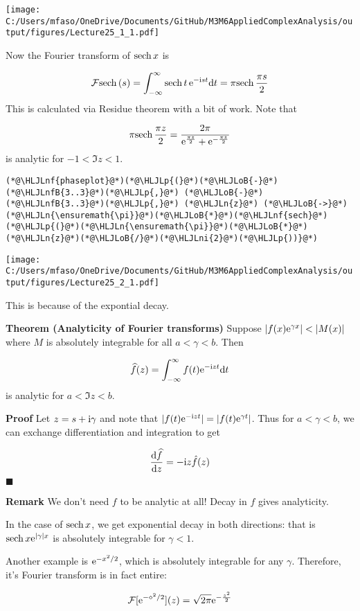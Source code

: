 \documentclass[12pt,landscape]{article}
\newcommand{\HLJLn}[1]{#1}
\newcommand{\HLJLnf}[1]{\textcolor[RGB]{66,102,213}{#1}}
\newcommand{\HLJLnfB}[1]{\textcolor[RGB]{59,151,46}{#1}}
\newcommand{\HLJLni}[1]{\textcolor[RGB]{59,151,46}{#1}}
\newcommand{\HLJLoB}[1]{\textcolor[RGB]{102,102,102}{\textbf{#1}}}
\newcommand{\HLJLp}[1]{#1}
\def\D{ {\rm d} }
\def\I{ {\rm i} }
\def\E{ {\rm e} }
\def\FF{ {\cal F} }
\def\sech{ {\rm sech}\, }
\def\dt{\D t}
\def\dz{\D z}
\begin{document}
{\texttt{[image: C:/Users/mfaso/OneDrive/Documents/GitHub/M3M6AppliedComplexAnalysis/output/figures/Lecture25\_1\_1.pdf]}

Now the Fourier transform of $\sech x$ is

\[
\FF\sech(s) = \int_{-\infty}^\infty \sech t \, \E^{-\I s t} \dt = \pi \sech{\pi s \over 2}
\]
This is calculated via Residue theorem with a bit of work. Note that

\[
\pi \sech {\pi z \over 2} = {2 \pi \over \E^{\pi z \over 2} + \E^{-{\pi z \over 2}}}
\]
is analytic for $-1 < \Im z < 1$.


\begin{lstlisting}
(*@\HLJLnf{phaseplot}@*)(*@\HLJLp{(}@*)(*@\HLJLoB{-}@*)(*@\HLJLnfB{3..3}@*)(*@\HLJLp{,}@*) (*@\HLJLoB{-}@*)(*@\HLJLnfB{3..3}@*)(*@\HLJLp{,}@*) (*@\HLJLn{z}@*) (*@\HLJLoB{->}@*) (*@\HLJLn{\ensuremath{\pi}}@*)(*@\HLJLoB{*}@*)(*@\HLJLnf{sech}@*)(*@\HLJLp{(}@*)(*@\HLJLn{\ensuremath{\pi}}@*)(*@\HLJLoB{*}@*)(*@\HLJLn{z}@*)(*@\HLJLoB{/}@*)(*@\HLJLni{2}@*)(*@\HLJLp{))}@*)
\end{lstlisting}

\texttt{[image: C:/Users/mfaso/OneDrive/Documents/GitHub/M3M6AppliedComplexAnalysis/output/figures/Lecture25\_2\_1.pdf]}

This is because of the expontial decay.

\textbf{Theorem (Analyticity of Fourier transforms)} Suppose $|f(x) \E^{\gamma x}| < |M(x)|$ where $M$ is absolutely integrable for all $a < \gamma < b$. Then

\[
\widehat f(z) = \int_{-\infty}^\infty f(t) \E^{-\I z t} \dt
\]
is analytic for $a < \Im z < b$.

\textbf{Proof} Let $z = s + \I \gamma$ and note that $|f(t) \E^{-\I z t}| = |f(t) \E^{\gamma t}|$. Thus for $a < \gamma < b$, we can exchange differentiation and integration to get

\[
{\D \widehat f \over \dz} = -\I z \hat f(z)
\]
\ensuremath{\blacksquare}

\textbf{Remark} We don't need $f$ to be analytic at all!  Decay in $f$ gives analyticity.

In the case of $\sech x$, we get exponential decay in both directions: that is $\sech x \E^{|\gamma| x}$ is absolutely integrable for $\gamma < 1$.

Another example is $\E^{-x^2/2}$, which is absolutely integrable for any $\gamma$. Therefore, it's Fourier transform is in fact entire:

\[
\FF[\E^{-\diamond^2/2}](z) = \sqrt{2\pi} \E^{-{z^2 \over 2}}
\]
}
\end{document}
